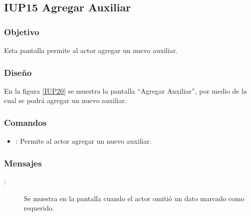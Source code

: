 \subsection{IUP15 Agregar Auxiliar}
 
\subsubsection{Objetivo}

    Esta pantalla permite al actor agregar un nuevo auxiliar.

\subsubsection{Diseño}

    En la figura \ref{IUP20} se muestra la pantalla ``Agregar Auxiliar'', por medio de la cual se podrá agregar un nuevo auxiliar. \\


\subsubsection{Comandos}
\begin{itemize}
    \item {}: Permite al actor agregar un nuevo auxiliar.
    
\end{itemize}

\subsubsection{Mensajes}

\begin{description}
    \item[:] Se muestra en la pantalla  cuando el actor omitió un dato marcado como requerido.
    
\end{description}
